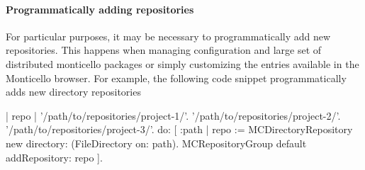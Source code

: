 \documentclass[a4paper,10pt,twoside]{book}
\begin{document}
\paragraph{Programmatically adding repositories} For particular purposes, it may be necessary to programmatically add new repositories. This happens when managing configuration and large set of distributed monticello packages or simply customizing the entries available in the Monticello browser. For example, the following code snippet programmatically adds new directory repositories

\begin{code}
| repo |
{'/path/to/repositories/project-1/'. 
'/path/to/repositories/project-2/'. 
'/path/to/repositories/project-3/'. } do: 
[ :path |
	repo := MCDirectoryRepository new directory: 
		(FileDirectory on: path).
	MCRepositoryGroup default addRepository: repo ].
\end{code}




\end{document}

